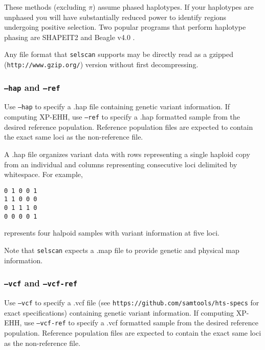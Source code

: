 \documentclass[12pt]{article}%
\begin{document}
These methods (excluding $\pi$) assume phased haplotypes.  If your haplotypes are unphased you will have substantially reduced power to identify regions undergoing positive selection.  Two popular programs that perform haplotype phasing are SHAPEIT2 \cite[]{DelaneauEtAl13} and Beagle v4.0 \cite[]{BrowningAndBrowning07}.

Any file format that {\tt selscan} supports may be directly read as a gzipped ({\tt http://www.gzip.org/}) version without first decompressing. 

\subsubsection{{\tt --hap} and {\tt --ref}}

Use {\tt --hap} to specify a .hap file containing genetic variant information.  If computing XP-EHH, use {\tt --ref} to specify a .hap formatted sample from the desired reference population.  Reference population files are expected to contain the exact same loci as the non-reference file.

A .hap file organizes variant data with rows representing a single haploid copy from an individual and columns representing consecutive loci delimited by whitespace.  For example,
\begin{lstlisting}
0 1 0 0 1
1 1 0 0 0
0 1 1 1 0
0 0 0 0 1
\end{lstlisting}
represents four halpoid samples with variant information at five loci.

Note that {\tt selscan} expects a .map file to provide genetic and physical map information.

\subsubsection{{\tt --vcf} and {\tt --vcf-ref}}

Use {\tt --vcf} to specify a .vcf file (see {\tt https://github.com/samtools/hts-specs} for exact specifications) containing genetic variant information.  If computing XP-EHH, use {\tt --vcf-ref} to specify a .vcf formatted sample from the desired reference population.  Reference population files are expected to contain the exact same loci as the non-reference file.
\end{document}
